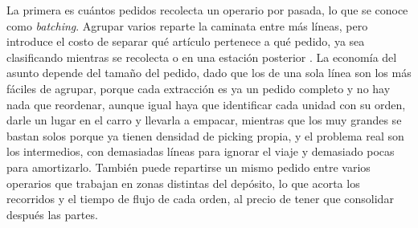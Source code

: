 La primera es cuántos pedidos recolecta un operario por pasada, lo que se conoce como \emph{batching}.
Agrupar varios reparte la caminata entre más líneas, pero introduce el costo de separar qué artículo pertenece a qué pedido, ya sea clasificando mientras se recolecta o en una estación posterior \citep[sección~3.3]{bartholdi2014warehouse}.
La economía del asunto depende del tamaño del pedido, dado que los de una sola línea son los más fáciles de agrupar, porque cada extracción es ya un pedido completo y no hay nada que reordenar, aunque igual haya que identificar cada unidad con su orden, darle un lugar en el carro y llevarla a empacar, mientras que los muy grandes se bastan solos porque ya tienen densidad de picking propia, y el problema real son los intermedios, con demasiadas líneas para ignorar el viaje y demasiado pocas para amortizarlo.
También puede repartirse un mismo pedido entre varios operarios que trabajan en zonas distintas del depósito, lo que acorta los recorridos y el tiempo de flujo de cada orden, al precio de tener que consolidar después las partes.

